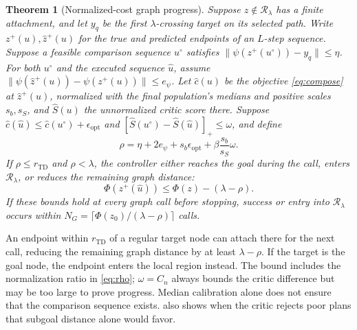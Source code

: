 \documentclass{article} %
\newcommand{\Htd}{r_{\mathrm{TD}}}
\newcommand{\Rset}{\mathcal R_\lambda}
\newtheorem{theorem}{Theorem}
\theoremstyle{definition}
\theoremstyle{remark}
\begin{document}
\begin{theorem}[Normalized-cost graph progress]
\label{thm:graph-progress}
Suppose $z\notin\Rset$ has a finite attachment, and let $y_q$ be the first
$\lambda$-crossing target on its selected path.
Write $z^+(u),\hat z^+(u)$ for the true and predicted endpoints of an $L$-step sequence.
Suppose a feasible comparison sequence $u^\circ$ satisfies
$\|\psi(z^+(u^\circ))-y_q\|\le\eta$.
For both $u^\circ$ and the executed sequence $\hat u$, assume
$\|\psi(\hat z^+(u))-\psi(z^+(u))\|\le e_\psi$.
Let $\hat c(u)$ be the objective \cref{eq:compose} at $\hat z^+(u)$, normalized with the final
population's medians and positive scales $s_b,s_S$, and $\widehat S(u)$ the unnormalized
critic score there.
Suppose $\hat c(\hat u)\le\hat c(u^\circ)+\epsilon_{\mathrm{opt}}$ and
$[\widehat S(u^\circ)-\widehat S(\hat u)]_+\le\omega$, and define
\begin{equation}
 \rho=\eta+2e_\psi+s_b\epsilon_{\mathrm{opt}}
                  +\beta\frac{s_b}{s_S}\omega .
 \label{eq:rho}
\end{equation}
If $\rho\le\Htd$ and $\rho<\lambda$, the controller either reaches the goal during the call,
enters $\Rset$, or reduces the remaining graph distance:
\begin{equation}
 \Phi(z^+(\hat u))\le\Phi(z)-(\lambda-\rho).
 \label{eq:graph-descent}
\end{equation}
If these bounds hold at every graph call before stopping, success or entry into $\Rset$ occurs within
$N_G=\lceil\Phi(z_0)/(\lambda-\rho)\rceil$ calls.
\end{theorem}

An endpoint within $\Htd$ of a regular target node can attach there for the next call,
reducing the remaining graph distance by at least $\lambda-\rho$.
If the target is the goal node, the endpoint enters the local region instead.
The bound includes the normalization ratio in \cref{eq:rho}; $\omega=C_n$ always bounds
the critic difference but may be too large to prove progress. Median calibration alone
does not ensure that the comparison sequence exists.  also
shows when the critic rejects poor plans that subgoal distance alone would favor.
\end{document}
